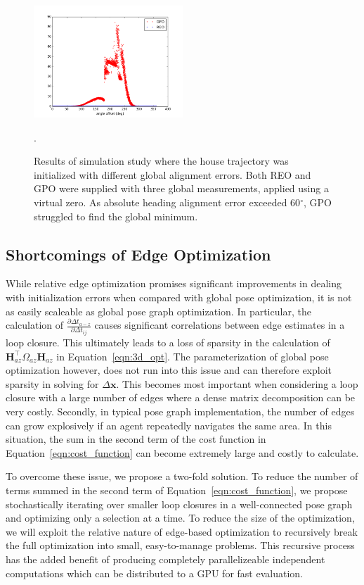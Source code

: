 \begin{figure}[H]
  \includegraphics[width=0.5\textwidth]{figures/REO_vs_GPO_global_measurement.png}
  \caption{Results of simulation study where the house trajectory was initialized with different global alignment errors.  Both REO and GPO were supplied with three global measurements, applied using a virtual zero.  As absolute heading alignment error exceeded 60$^\circ$, GPO struggled to find the global minimum.}
  \label{fig:global_heading_error_results}.
\end{figure}

\subsection{Shortcomings of Edge Optimization}

While relative edge optimization promises significant improvements in dealing with initialization errors when compared with global pose optimization, it is not as easily scaleable as global pose graph optimization.  In particular, the calculation of $\frac {\partial\Delta t_{a-z}}{\partial\Delta t_{ij}}$ causes significant correlations between edge estimates in a loop closure.  This ultimately leads to a loss of sparsity in the calculation of $\mathbf{H}_{az}^\top \Omega_{az} \mathbf{H}_{az}$ in Equation~\ref{eqn:3d_opt}.  The parameterization of global pose optimization however, does not run into this issue and can therefore exploit sparsity in solving for $\Delta \mathbf{x}$.  This becomes most important when considering a loop closure with a large number of edges where a dense matrix decomposition can be very costly. Secondly, in typical pose graph implementation, the number of edges can grow explosively if an agent repeatedly navigates the same area.  In this situation, the sum in the second term of the cost function in Equation~\ref{eqn:cost_function} can become extremely large and costly to calculate.

To overcome these issue, we propose a two-fold solution.  To reduce the number of terms summed in the second term of Equation~\ref{eqn:cost_function}, we propose stochastically iterating over smaller loop closures in a well-connected pose graph and optimizing only a selection at a time.  To reduce the size of the optimization, we will exploit the relative nature of edge-based optimization to recursively break the full optimization into small, easy-to-manage problems.  This recursive process has the added benefit of producing completely parallelizeable independent computations which can be distributed to a GPU for fast evaluation.

